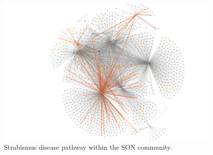 \begin{figure}[H]
    \centering
    \includegraphics[width=0.8\linewidth]{images/plots/strabismus_SON.png}
    \caption{Strabismus disease pathway within the SON community.}
    \label{fig:strabismus_SON}
\end{figure}

